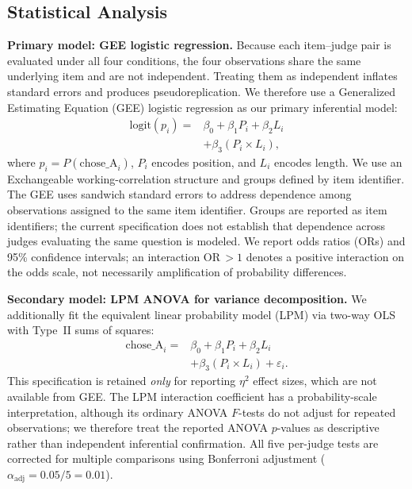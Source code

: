 \documentclass[10pt,conference]{IEEEtran}
\begin{document}
\subsection{Statistical Analysis}
\textbf{Primary model: GEE logistic regression.} Because each item--judge pair is evaluated under all four conditions, the four observations share the same underlying item and are not independent. Treating them as independent inflates standard errors and produces pseudoreplication. We therefore use a Generalized Estimating Equation (GEE) logistic regression as our primary inferential model:
\begin{equation}
\begin{split}
\mathrm{logit}(p_i) ={}& \beta_0+\beta_1P_i+\beta_2L_i\\
&+\beta_3(P_i\times L_i),
\end{split}
\label{eq:gee}
\end{equation}
where $p_i=P(\text{chose\_A}_i)$, $P_i$ encodes position, and $L_i$ encodes length. We use an Exchangeable working-correlation structure and groups defined by item identifier. The GEE uses sandwich standard errors to address dependence among observations assigned to the same item identifier. Groups are reported as item identifiers; the current specification does not establish that dependence across judges evaluating the same question is modeled. We report odds ratios (ORs) and 95\% confidence intervals; an interaction OR\,$>1$ denotes a positive interaction on the odds scale, not necessarily amplification of probability differences.

\textbf{Secondary model: LPM ANOVA for variance decomposition.} We additionally fit the equivalent linear probability model (LPM) via two-way OLS with Type~II sums of squares:
\begin{equation}
\begin{split}
\text{chose\_A}_i ={}& \beta_0+\beta_1P_i+\beta_2L_i\\
&+\beta_3(P_i\times L_i)+\varepsilon_i.
\end{split}
\label{eq:lpm}
\end{equation}
This specification is retained \emph{only} for reporting $\eta^2$ effect sizes, which are not available from GEE. The LPM interaction coefficient has a probability-scale interpretation, although its ordinary ANOVA $F$-tests do not adjust for repeated observations; we therefore treat the reported ANOVA $p$-values as descriptive rather than independent inferential confirmation. All five per-judge tests are corrected for multiple comparisons using Bonferroni adjustment ($\alpha_{\mathrm{adj}}=0.05/5=0.01$).
\end{document}

